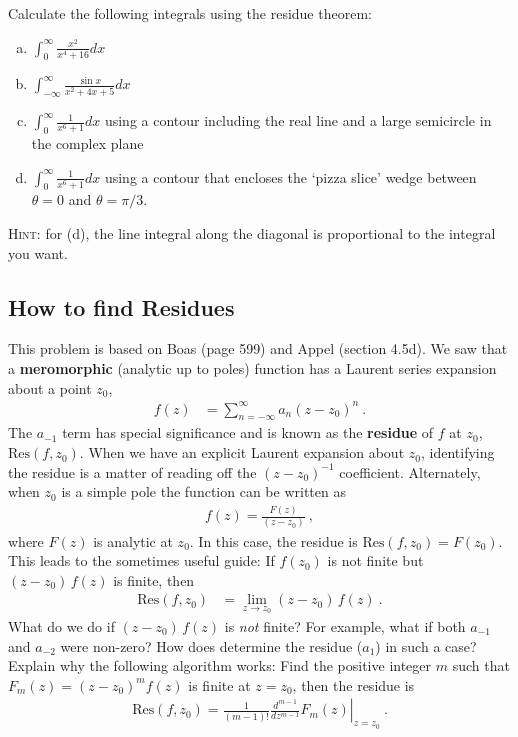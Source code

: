 \documentclass[12pt]{article}
\numberwithin{equation}{subsection}    %
\begin{document}
Calculate the following integrals using the residue theorem:
\begin{enumerate}[(a)]
	\item $\displaystyle \int_{0}^\infty \frac{x^2}{x^4 + 16} dx$ %
	\item $\displaystyle \int_{-\infty}^\infty \frac{\sin x}{x^2 + 4x + 5}dx$ %
	\item $\displaystyle \int_{0}^\infty \frac{1}{x^6+1}dx$ using a contour including the real line and a large semicircle in the complex plane %
	\item $\displaystyle \int_{0}^\infty \frac{1}{x^6+1}dx$ using a contour that encloses the `pizza slice' wedge between $\theta = 0$ and $\theta = \pi/3$. 
\end{enumerate}

\textsc{Hint}: for (d), the line integral along the diagonal is proportional to the integral you want. %






\subsection{How to find Residues}

This problem is based on Boas (page 599) and Appel (section 4.5d).
%
We saw that a \textbf{meromorphic} (analytic up to poles) function has a Laurent series expansion about a point $z_0$,
\begin{align}
f(z) &= \sum_{n=-\infty}^{\infty} a_n (z-z_0)^n
	\ .
\end{align}
The $a_{-1}$ term has special significance and is known as the \textbf{residue} of $f$ at $z_0$, $\text{Res}(f,z_0)$. When we have an explicit Laurent expansion about $z_0$, identifying the residue is a matter of reading off the $(z-z_0)^{-1}$ coefficient. Alternately, when $z_0$ is a simple pole the function can be written as
\begin{align}
	f(z) = \frac{F(z)}{(z-z_0)} \ ,
\end{align}
where $F(z)$ is analytic at $z_0$. In this case, the residue is $\text{Res}(f,z_0) = F(z_0)$. This leads to the sometimes useful guide: If $f(z_0)$ is not finite but $(z-z_0)\, f(z)$ is finite, then
	\begin{align}
		\text{Res}(f,z_0) &=  \lim_{z\to z_0} (z-z_0)\, f(z) \ .
	\end{align}
What do we do if $(z-z_0)\, f(z)$ is \emph{not} finite? For example, what if both $a_{-1}$ and $a_{-2}$ were non-zero? How does determine the residue ($a_1$) in such a case? Explain why the following algorithm works: Find the positive integer $m$ such that $F_m(z)=(z-z_0)^m f(z)$ is finite at $z=z_0$, then the residue is
\begin{align}
	\text{Res}(f,z_0) = \left.\frac{1}{(m-1)!} \frac{d^{m-1}}{dz^{m-1}} F_m(z)\right|_{z=z_0} \ .
\end{align}
\end{document}
